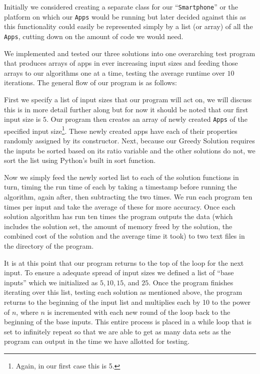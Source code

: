 \documentclass{article}
\begin{document}
Initially we considered creating a separate class for our ``\texttt{Smartphone}'' or the platform on which our \texttt{Apps} would be running but later decided against this as this functionality could easily be represented simply by a list (or array) of all the \texttt{Apps}, cutting down on the amount of code we would need.

We implemented and tested our three solutions into one overarching test program that produces arrays of apps in ever increasing input sizes and feeding those arrays to our algorithms one at a time, testing the average runtime over $10$ iterations. The general flow of our program is as follows:

First we specify a list of input sizes that our program will act on, we will discuss this is in more detail further along but for now it should be noted that our first input size is $5$. Our program then creates an array of newly created \texttt{Apps} of the specified input size\footnote{Again, in our first case this is 5.}. These newly created apps have each of their properties randomly assigned by its constructor. Next, because our Greedy Solution requires the inputs be sorted based on its ratio variable and the other solutions do not, we sort the list using Python’s built in sort function.

Now we simply feed the newly sorted list to each of the solution functions in turn, timing the run time of each by taking a timestamp before running the algorithm, again after, then subtracting the two times. We run each program ten times per input and take the average of these for more accuracy. Once each solution algorithm has run ten times the program outputs the data (which includes the solution set, the amount of memory freed by the solution, the combined cost of the solution and the average time it took) to two text files in the directory of the program.

It is at this point that our program returns to the top of the loop for the next input. To ensure a adequate spread of input sizes we defined a list of “base inputs” which we initialized as $5, 10, 15$, and $25$. Once the program finishes iterating over this list, testing each solution as mentioned above, the program returns to the beginning of the input list and multiplies each by 10 to the power of $n$, where $n$ is incremented with each new round of the loop back to the beginning of the base inputs. This entire process is placed in a while loop that is set to infinitely repeat so that we are able to get as many data sets as the program can output in the time we have allotted for testing.
\end{document}
